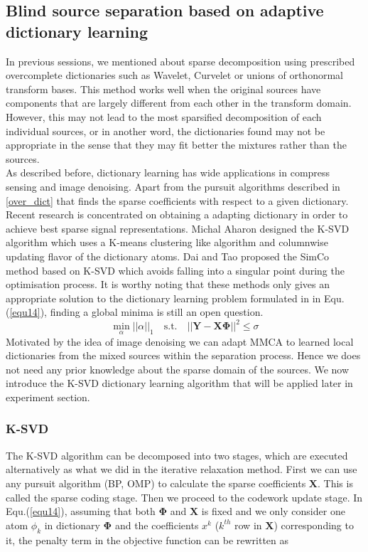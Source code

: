\subsection{Blind source separation based on adaptive dictionary learning}
In previous sessions, we mentioned about sparse decomposition using prescribed overcomplete dictionaries such as Wavelet, Curvelet or unions of orthonormal transform bases. This method works well when the original sources have components that are largely different from each other in the transform domain. However, this may not lead to the most sparsified decomposition of each individual sources, or in another word, the dictionaries found may not be appropriate in the sense that they may fit better the mixtures rather than the sources.\\

As described before, dictionary learning has wide applications in compress sensing and image denoising. Apart from the pursuit algorithms described in \ref{over_dict} that finds the sparse coefficients with respect to a given dictionary. Recent research is concentrated on obtaining a adapting dictionary in order to achieve best sparse signal representations. Michal Aharon designed the K-SVD \cite{AharonM2006KAaf} algorithm which uses a K-means clustering like algorithm and columnwise updating flavor of the dictionary atoms. Dai and Tao proposed the SimCo method \cite{6340354} based on K-SVD which avoids falling into a singular point during the optimisation process. It is worthy noting that these methods only gives an appropriate solution to the dictionary learning problem formulated in in Equ.(\ref{equ14}), finding a global minima is still an open question.\\
\begin{equation}
    \min_{\alpha}||\alpha||_1 \quad \text{s.t.} \quad || \mathbf{Y} - \mathbf{X} \mathbf{\Phi}||^2 \leq \sigma
    \label{equ14}
\end{equation}
Motivated by the idea of image denoising we can adapt MMCA to learned local dictionaries from the mixed sources within the separation process\cite{VAbolghasemi2012}. Hence we does not need any prior knowledge about the sparse domain of the sources. We now introduce the K-SVD dictionary learning algorithm that will be applied later in experiment section.\\

\subsubsection{K-SVD}
The K-SVD algorithm can be decomposed into two stages, which are executed alternatively as what we did in the iterative relaxation method. First we can use any pursuit algorithm (BP, OMP) to calculate the sparse coefficients $\mathbf{X}$. This is called the sparse coding stage. Then we proceed to the codework update stage. In Equ.(\ref{equ14}), assuming that both $\mathbf{\Phi}$ and $\mathbf{X}$ is fixed and we only consider one atom $\phi_k$ in dictionary $\mathbf{\Phi}$ and the coefficients $x^k$ ($k^{th}$ row in $\mathbf{X}$) corresponding to it, the penalty term in the objective function can be rewritten as


